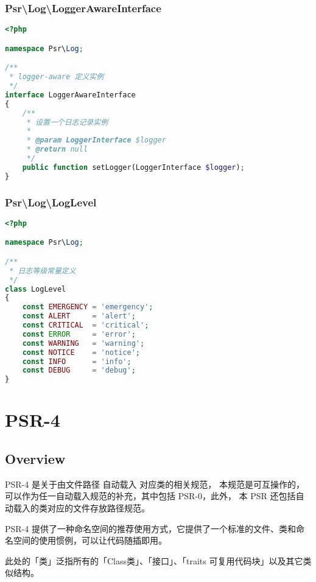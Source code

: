 \subsection{Psr\textbackslash Log\textbackslash LoggerAwareInterface}



\begin{lstlisting}[language=PHP]
<?php

namespace Psr\Log;

/**
 * logger-aware 定义实例
 */
interface LoggerAwareInterface
{
    /**
     * 设置一个日志记录实例
     *
     * @param LoggerInterface $logger
     * @return null
     */
    public function setLogger(LoggerInterface $logger);
}
\end{lstlisting}


\subsection{Psr\textbackslash Log\textbackslash LogLevel}


\begin{lstlisting}[language=PHP]
<?php

namespace Psr\Log;

/**
 * 日志等级常量定义
 */
class LogLevel
{
    const EMERGENCY = 'emergency';
    const ALERT     = 'alert';
    const CRITICAL  = 'critical';
    const ERROR     = 'error';
    const WARNING   = 'warning';
    const NOTICE    = 'notice';
    const INFO      = 'info';
    const DEBUG     = 'debug';
}
\end{lstlisting}

\chapter{PSR-4}


\section{Overview}


PSR-4 是关于由文件路径 自动载入 对应类的相关规范， 本规范是可互操作的，可以作为任一自动载入规范的补充，其中包括 PSR-0，此外， 本 PSR 还包括自动载入的类对应的文件存放路径规范。

PSR-4 提供了一种命名空间的推荐使用方式，它提供了一个标准的文件、类和命名空间的使用惯例，可以让代码随插即用。

此处的「类」泛指所有的「Class类」、「接口」、「traits 可复用代码块」以及其它类似结构。

